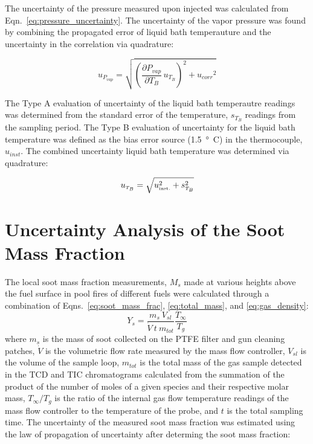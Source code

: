 \documentclass[12pt]{article}
\begin{document}
The uncertainty of the pressure measured upon injected was calculated from Eqn.~\ref{eq:pressure_uncertainty}. The uncertainty of the vapor pressure was found by combining the propagated error of liquid bath temperauture and the uncertainty in the correlation via quadrature:

\begin{equation}
\label{eq:vapor_concentration_uncertainty}
u_{\scriptscriptstyle P_{vap}} = \sqrt{{\left(\frac{\partial P_{vap}}{\partial T_{B}}\,u_{\scriptscriptstyle T_{B}} \right)}^2+{u_{corr}}^2}
\end{equation} 

The Type A evaluation of uncertainty of the liquid bath temperautre readings was determined from the standard error of the temperature, $s_{T_{B}}$ readings from the sampling period. The Type B evaluation of uncertainty for the liquid bath temperature was defined as the bias error source (\SI{1.5}{\degree C}) in the thermocouple, $u_{inst}$. The combined uncertainty liquid bath temperature was determined via quadrature:

\begin{equation}
\label{eq:temp_bath_uncertainty}
u_{\scriptscriptstyle T_{B}} = \sqrt{u_{\rm \scriptscriptstyle inst.}^2 + s_{\scriptscriptstyle T_{B}}^2}
\end{equation}
\pagebreak

\section{Uncertainty Analysis of the Soot Mass Fraction} \label{sec:Uncertainty_Soot_Frac}
The local soot mass fraction measurements, $M_{s}$ made at various heights above the fuel surface in pool fires of different fuels were calculated through a combination of Eqns.~\ref{eq:soot_mass_frac}, \ref{eq:total_mass}, and \ref{eq:gas_density}:
\begin{equation}\label{eq:overall_soot_mass_frac}
Y_{s}= \frac{m_{s}~V_{sl}}{\dot{V}~t~m_{tot}}\frac{T_{\infty}}{T_{g}}
\end{equation}
where $m_{s}$ is the mass of soot collected on the PTFE filter and gun cleaning patches, $\dot{V}$ is the volumetric flow rate measured by the mass flow controller, $V_{sl}$ is the volume of the sample loop, $m_{tot}$ is the total mass of the gas sample detected in the TCD and TIC chromatograms calculated from the summation of the product of the number of moles of a given species and their respective molar mass, $T_{\infty}/T_{g}$ is the ratio of the internal gas flow temperature readings of the mass flow controller to the temperature of the probe, and $t$ is the total sampling time. The uncertainty of the measured soot mass fraction was estimated using the law of propagation of uncertainty after determing the soot mass fraction:
\end{document}
